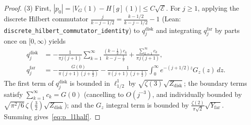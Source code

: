 \documentclass[11pt,a4paper]{article}
\begin{document}
\begin{proof}
(3) First, $|p_0|=|V_G(1)-H[g](1)|\le C\sqrt{\mathcal{E}}$.
For $j\ge 1$, applying the discrete Hilbert commutator $\frac{j}{k-j-1/2}=\frac{k-1/2}{k-j-1/2}-1$
(Lean: \texttt{discrete\_hilbert\_commutator\_identity}) to $q_j^{\mathrm{disk}}$ and integrating $q_j^{\mathrm{far}}$
by parts once on $[0,\infty)$ yields
\begin{align*}
q_j^{\mathrm{disk}} &= -\frac{1}{\pi j(j+1)}\sum_{k=1}^\infty\frac{(k-\tfrac12)c_k}{k-j-\tfrac12} + \frac{\sum_{k=1}^\infty c_k}{\pi j(j+1)}, \\
q_j^{\mathrm{far}} &= -\frac{G(0)}{\pi(j+1)(j+\tfrac12)} - \frac{1}{\pi(j+1)(j+\tfrac12)}\int_0^\infty e^{-(j+1/2)z}G_z(z)\,dz.
\end{align*}
The first term of $q_j^{\mathrm{disk}}$ is bounded in $\ell^1_{1/2}$ by
$\sqrt{\zeta(3)}\sqrt{Z_{\mathrm{disk}}}$; the boundary terms satisfy $\sum_{k=1}^\infty c_k = G(0)$
(cancelling to $O(j^{-3})$, and individually bounded by $\sqrt{\pi^2/6}\,\zeta(\tfrac32)\sqrt{Z_{\mathrm{disk}}}$);
and the $G_z$ integral term is bounded by $\frac{\zeta(2)}{\pi\sqrt{2}}\sqrt{Y_{\mathrm{far}}}$.
Summing gives~\eqref{eq:p_l1half}.
\end{proof}
\end{document}
